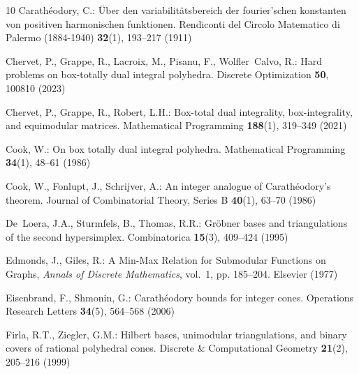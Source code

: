 \documentclass[11pt,a4paper]{amsart}
\theoremstyle{plain}
\theoremstyle{definition}
\begin{document}
\begin{thebibliography}{10}
Carathéodory, C.: Über den variabilitätsbereich der fourier’schen
konstanten von positiven harmonischen funktionen.
\newblock Rendiconti del Circolo Matematico di Palermo (1884-1940)
\textbf{32}(1), 193--217 (1911)

Chervet, P., Grappe, R., Lacroix, M., Pisanu, F., Wolfler~Calvo, R.: Hard
problems on box-totally dual integral polyhedra.
\newblock Discrete Optimization \textbf{50}, 100810 (2023)

Chervet, P., Grappe, R., Robert, L.H.: Box-total dual integrality,
box-integrality, and equimodular matrices.
\newblock Mathematical Programming \textbf{188}(1), 319–349 (2021)

Cook, W.: On box totally dual integral polyhedra.
\newblock Mathematical Programming \textbf{34}(1), 48–61 (1986)

Cook, W., Fonlupt, J., Schrijver, A.: An integer analogue of
{C}arath{\'e}odory’s theorem.
\newblock Journal of Combinatorial Theory, Series B \textbf{40}(1), 63–70
(1986)

De~Loera, J.A., Sturmfels, B., Thomas, R.R.: Gröbner bases and triangulations
of the second hypersimplex.
\newblock Combinatorica \textbf{15}(3), 409–424 (1995)

Edmonds, J., Giles, R.: A Min-Max Relation for Submodular Functions on Graphs,
\emph{Annals of Discrete Mathematics}, vol.~1, pp. 185–204.
\newblock Elsevier (1977)

Eisenbrand, F., Shmonin, G.: Carath{\'e}odory bounds for integer cones.
\newblock Operations Research Letters \textbf{34}(5), 564--568 (2006)

Firla, R.T., Ziegler, G.M.: Hilbert bases, unimodular triangulations, and
binary covers of rational polyhedral cones.
\newblock Discrete \& Computational Geometry \textbf{21}(2), 205–216 (1999)


\end{thebibliography}
\end{document}
